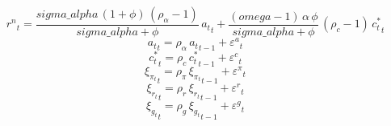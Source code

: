 \begin{dmath}
{{r^{n}}}_{t}=\frac{{sigma\_alpha}\, \left(1+{\phi}\right)\, \left({\rho_{\alpha}}-1\right)}{{sigma\_alpha}+{\phi}}\, {a_{t}}_{t}+\frac{\left({omega}-1\right)\, {\alpha}\, {\phi}}{{sigma\_alpha}+{\phi}}\, \left({\rho_{c}}-1\right)\, {c_{t}^*}_{t}
\end{dmath}
\begin{dmath}
{a_{t}}_{t}={\rho_{\alpha}}\, {a_{t}}_{t-1}+{{\varepsilon^a}}_{t}
\end{dmath}
\begin{dmath}
{c_{t}^*}_{t}={\rho_{c}}\, {c_{t}^*}_{t-1}+{{\varepsilon^c}}_{t}
\end{dmath}
\begin{dmath}
{\xi_{\pi_{t}}}_{t}={\rho_{\pi}}\, {\xi_{\pi_{t}}}_{t-1}+{{\varepsilon^{\pi}}}_{t}
\end{dmath}
\begin{dmath}
{\xi_{r}_{t}}_{t}={\rho_{r}}\, {\xi_{r}_{t}}_{t-1}+{{\varepsilon^{r}}}_{t}
\end{dmath}
\begin{dmath}
{\xi_{g}_{t}}_{t}={\rho_{g}}\, {\xi_{g}_{t}}_{t-1}+{{\varepsilon^{g}}}_{t}
\end{dmath}
